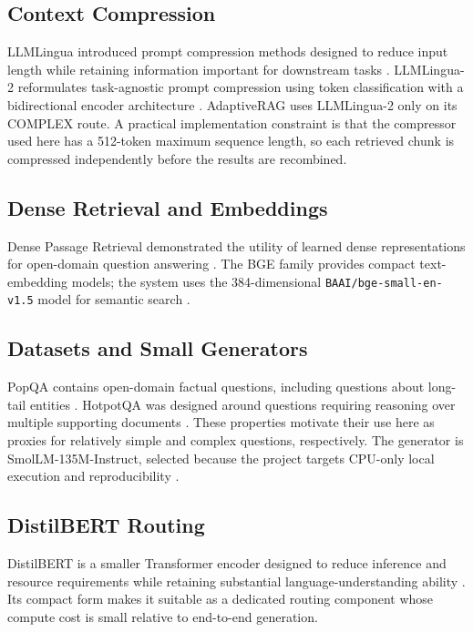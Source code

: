 \documentclass[conference]{IEEEtran}
\begin{document}
\subsection{Context Compression}
LLMLingua introduced prompt compression methods designed to reduce input length while retaining information important for downstream tasks \cite{jiang2023llmlingua}. LLMLingua-2 reformulates task-agnostic prompt compression using token classification with a bidirectional encoder architecture \cite{pan2024llmlingua2}. AdaptiveRAG uses LLMLingua-2 only on its COMPLEX route. A practical implementation constraint is that the compressor used here has a 512-token maximum sequence length, so each retrieved chunk is compressed independently before the results are recombined.

\subsection{Dense Retrieval and Embeddings}
Dense Passage Retrieval demonstrated the utility of learned dense representations for open-domain question answering \cite{karpukhin2020dpr}. The BGE family provides compact text-embedding models; the system uses the 384-dimensional \texttt{BAAI/bge-small-en-v1.5} model for semantic search \cite{xiao2023cpack}.

\subsection{Datasets and Small Generators}
PopQA contains open-domain factual questions, including questions about long-tail entities \cite{mallen2023trust}. HotpotQA was designed around questions requiring reasoning over multiple supporting documents \cite{yang2018hotpotqa}. These properties motivate their use here as proxies for relatively simple and complex questions, respectively. The generator is SmolLM-135M-Instruct, selected because the project targets CPU-only local execution and reproducibility \cite{allal2024smollm}.

\subsection{DistilBERT Routing}
DistilBERT is a smaller Transformer encoder designed to reduce inference and resource requirements while retaining substantial language-understanding ability \cite{sanh2019distilbert}. Its compact form makes it suitable as a dedicated routing component whose compute cost is small relative to end-to-end generation.
\end{document}
